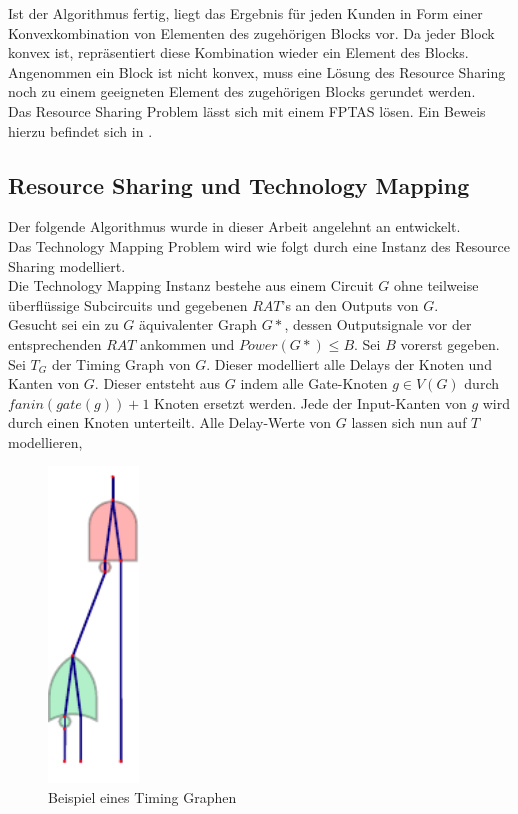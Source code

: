 \documentclass[11pt, a4paper, german]{article}
\newcommand{\TM}{Technology  Mapping }
\begin{document}
Ist der Algorithmus fertig, liegt das Ergebnis für jeden Kunden in Form einer Konvexkombination von Elementen des zugehörigen Blocks vor. Da jeder Block konvex ist, repräsentiert diese Kombination wieder ein Element des Blocks. \\
Angenommen ein Block ist nicht konvex, muss eine Lösung des Resource Sharing noch zu einem geeigneten Element des zugehörigen Blocks gerundet werden.\\

Das Resource Sharing Problem lässt sich mit einem FPTAS lösen. Ein Beweis hierzu befindet sich in \cite{Vygen2011}.

\subsection{Resource Sharing und \TM}
Der folgende Algorithmus wurde in dieser Arbeit angelehnt an \cite{Daboul2018} entwickelt.\\
Das \TM Problem wird wie folgt durch eine Instanz des Resource Sharing modelliert.\\
Die \TM Instanz bestehe aus einem Circuit $G$ ohne teilweise überflüssige Subcircuits und gegebenen $RAT$'s an den Outputs von $G$. \\
Gesucht sei ein zu $G$ äquivalenter Graph $G*$, dessen Outputsignale vor der entsprechenden $RAT$ ankommen und $Power(G*) \leq B$. Sei $B$ vorerst gegeben. \\
Sei $T_G$ der Timing Graph von $G$. Dieser modelliert alle Delays der Knoten und Kanten von $G$. 
Dieser entsteht aus $G$ indem alle Gate-Knoten $g \in V(G)$ durch $fanin(gate(g)) +1$ Knoten ersetzt werden. Jede der Input-Kanten von $g$ wird durch einen Knoten unterteilt.  Alle Delay-Werte von $G$ lassen sich nun auf $T$ modellieren, 
   \begin{figure}
		\includegraphics[width = 2.4cm]{pictures/compiled/timing_graph}
		\caption{Beispiel eines Timing Graphen}
		\label{bild:timing_graph}
	\end{figure}
\end{document}

